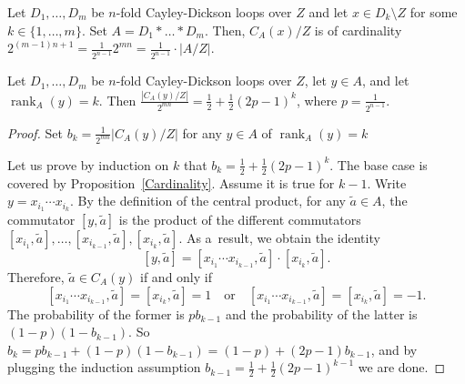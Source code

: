 \documentclass[10pt,a4paper]{amsart}
\begin{document}
	\begin{proposition}\label{Cardinality}
		Let $D_1,\dots,D_m$ be $n$-fold Cayley-Dickson loops over $Z$ and let $x \in D_k \setminus Z$ for some $k \in \{1,\dots,m\}$. Set $A=D_1 \ast \dots \ast D_m$. Then, $C_A (x)/Z$ is of cardinality $2^{(m-1)n+1}=\frac{1}{2^{n-1}}2^{mn}=\frac{1}{2^{n-1}}\cdot|A/Z|$.
	\end{proposition}

	\begin{theorem}\label{recurrence}
		Let $D_1,\dots,D_m$ be $n$-fold Cayley-Dickson loops over $Z$, let $y \in A$, and let $\operatorname{rank}_A (y) = k$. Then $\frac{|C_A (y)/Z|}{2^{mn}}=\frac{1}{2}+\frac{1}{2}(2p-1)^k$, where $p=\frac{1}{2^{n-1}}$.
	\end{theorem}

	\begin{proof}
		Set $b_k =\frac{1}{2^{mn}}|C_A (y)/Z|$ for any $y \in A$ of $\operatorname{rank}_A (y) = k$

		Let us prove by induction on $k$ that $b_k =\frac{1}{2}+\frac{1}{2}(2p-1)^k$. The base case is covered by Proposition~\ref{Cardinality}. Assume it is true for $k-1$. Write $y = x_{i_1}\cdots x_{i_k}$. By the definition of the central product, for any $\tilde{a} \in A$, the commutator $[y,\tilde{a}]$ is the product of the different commutators $[x_{i_1},\tilde{a}],\dots,[x_{i_{k-1}},\tilde{a}],[x_{i_k},\tilde{a}]$. As a~result, we obtain the identity
		\[
            [y,\tilde{a}] 
            = [x_{i_1}\cdots x_{i_{k-1}}, \tilde{a}] \cdot [x_{i_k},\tilde{a}].
        \]
        Therefore, $\tilde{a} \in C_A (y)$ if and only if 
        \[
            [x_{i_1}\cdots x_{i_{k-1}},\tilde{a}] 
            = [x_{i_k},\tilde{a}] = 1
            \quad \text{or} \quad
            [x_{i_1}\cdots x_{i_{k-1}},\tilde{a}] 
            = [x_{i_k},\tilde{a}] = -1.
        \]
        The probability of the former is $pb_{k-1}$ and the probability of the latter is $(1-p)(1-b_{k-1})$. So $b_k = pb_{k-1}+(1-p)(1-b_{k-1}) = (1-p)+(2p-1)b_{k-1}$, and by plugging the induction assumption $b_{k-1} = \frac{1}{2}+\frac{1}{2}(2p-1)^{k-1}$ we are done.
	\end{proof}
\end{document}
